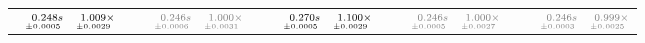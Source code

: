\documentclass[a4paper,UKenglish]{lipics-v2016}
\begin{document}
\begin{table*}
\begin{adjustbox}{width=1.2\textwidth,center}
\begin{tabular}{rrrp{.1em}rrrp{.1em}rrrp{.1em}rrrp{.1em}rrr}
\cellcolor{black!5}{\tiny p$_{14}$:}&\cellcolor{black!5}$\substack{\mathmakebox[.7cm][r]{0.248}s\\{\mathmakebox[.7cm][r]{\scriptscriptstyle \pm 0.0005}}}$&\cellcolor{black!5}$\substack{\mathmakebox[.7cm][r]{1.009}\times\\{\mathmakebox[.7cm][r]{\scriptscriptstyle \pm 0.0029}}}$&&\cellcolor{black!5}{\tiny \color{gray}{p$_{30}$}:}&\cellcolor{black!5}$\substack{\mathmakebox[.7cm][r]{\color{gray}{0.246}}\color{gray}{s}\\{\mathmakebox[.7cm][r]{\scriptscriptstyle \color{gray}{\pm 0.0006}}}}$&\cellcolor{black!5}$\substack{\mathmakebox[.7cm][r]{\color{gray}{1.000}}\color{gray}{\times}\\{\mathmakebox[.7cm][r]{\scriptscriptstyle \color{gray}{\pm 0.0031}}}}$&&\cellcolor{black!5}{\tiny p$_{46}$:}&\cellcolor{black!5}$\substack{\mathmakebox[.7cm][r]{0.270}s\\{\mathmakebox[.7cm][r]{\scriptscriptstyle \pm 0.0005}}}$&\cellcolor{black!5}$\substack{\mathmakebox[.7cm][r]{1.100}\times\\{\mathmakebox[.7cm][r]{\scriptscriptstyle \pm 0.0029}}}$&&\cellcolor{black!5}{\tiny \color{gray}{p$_{62}$}:}&\cellcolor{black!5}$\substack{\mathmakebox[.7cm][r]{\color{gray}{0.246}}\color{gray}{s}\\{\mathmakebox[.7cm][r]{\scriptscriptstyle \color{gray}{\pm 0.0005}}}}$&\cellcolor{black!5}$\substack{\mathmakebox[.7cm][r]{\color{gray}{1.000}}\color{gray}{\times}\\{\mathmakebox[.7cm][r]{\scriptscriptstyle \color{gray}{\pm 0.0027}}}}$&&\cellcolor{black!5}{\tiny \color{gray}{p$_{78}$}:}&\cellcolor{black!5}$\substack{\mathmakebox[.7cm][r]{\color{gray}{0.246}}\color{gray}{s}\\{\mathmakebox[.7cm][r]{\scriptscriptstyle \color{gray}{\pm 0.0003}}}}$&\cellcolor{black!5}$\substack{\mathmakebox[.7cm][r]{\color{gray}{0.999}}\color{gray}{\times}\\{\mathmakebox[.7cm][r]{\scriptscriptstyle \color{gray}{\pm 0.0025}}}}$\\

\end{tabular}
\end{adjustbox}
\end{table*}
\end{document}

